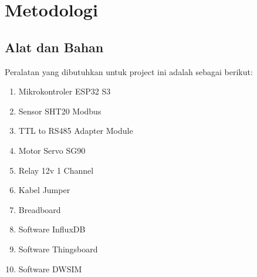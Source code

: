 \documentclass[a4paper, 12pt]{article}
\begin{document}
\section{Metodologi}

\subsection{Alat dan Bahan}
Peralatan yang dibutuhkan untuk project ini adalah sebagai berikut:
\begin{enumerate}
    \item Mikrokontroler ESP32 S3
    \item Sensor SHT20 Modbus
    \item TTL to RS485 Adapter Module
    \item Motor Servo SG90
    \item Relay 12v 1 Channel
    \item Kabel Jumper
    \item Breadboard
    \item Software InfluxDB
    \item Software Thingsboard
    \item Software DWSIM
\end{enumerate}
\end{document}
